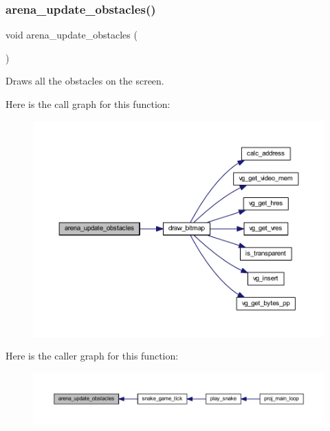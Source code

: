 \subsubsection{\texorpdfstring{arena\+\_\+update\+\_\+obstacles()}{arena\_update\_obstacles()}}
{\footnotesize\ttfamily void arena\+\_\+update\+\_\+obstacles (\begin{DoxyParamCaption}{ }\end{DoxyParamCaption})}



Draws all the obstacles on the screen. 

Here is the call graph for this function\+:\nopagebreak
\begin{figure}[H]
\begin{center}
\leavevmode
\includegraphics[width=350pt]{group__snake_ga4890845dc17bb18e466ffc2590f1d067_cgraph}
\end{center}
\end{figure}
Here is the caller graph for this function\+:\nopagebreak
\begin{figure}[H]
\begin{center}
\leavevmode
\includegraphics[width=350pt]{group__snake_ga4890845dc17bb18e466ffc2590f1d067_icgraph}
\end{center}
\end{figure}
\mbox{\label{group__snake_gac5b60c5a2d1ca79c4983372122b5183a}} 
